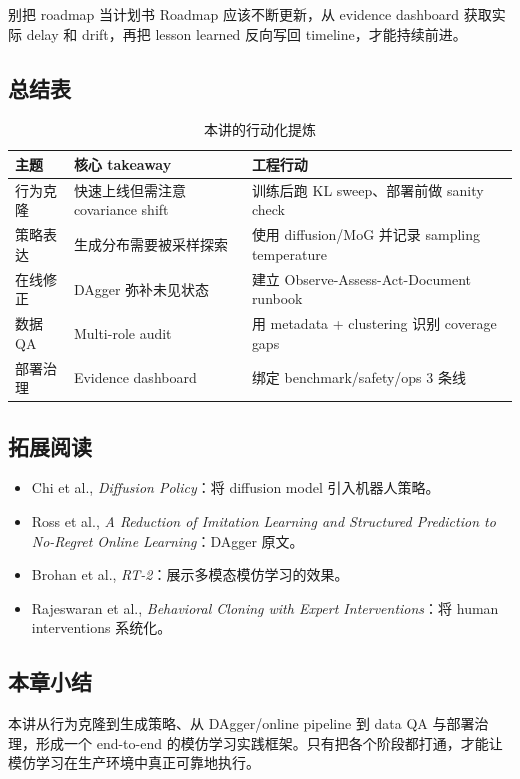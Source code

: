 \begin{warningbox}{别把 roadmap 当计划书}
Roadmap 应该不断更新，从 evidence dashboard 获取实际 delay 和 drift，再把 lesson learned 反向写回 timeline，才能持续前进。
\end{warningbox}

\subsection{总结表}

\begin{table}[H]
\centering
\begin{tabular}{p{} p{} p{}}
\toprule
主题 & 核心 takeaway & 工程行动 \\
\midrule
行为克隆 & 快速上线但需注意 covariance shift & 训练后跑 KL sweep、部署前做 sanity check \\
策略表达 & 生成分布需要被采样探索 & 使用 diffusion/MoG 并记录 sampling temperature \\
在线修正 & DAgger 弥补未见状态 & 建立 Observe-Assess-Act-Document runbook \\
数据 QA & Multi-role audit & 用 metadata + clustering 识别 coverage gaps \\
部署治理 & Evidence dashboard & 绑定 benchmark/safety/ops 3 条线 \\
\bottomrule
\end{tabular}
\caption{本讲的行动化提炼}
\end{table}

\subsection{拓展阅读}
\begin{itemize}
    \item Chi et al., \textit{Diffusion Policy}：将 diffusion model 引入机器人策略。
    \item Ross et al., \textit{A Reduction of Imitation Learning and Structured Prediction to No-Regret Online Learning}：DAgger 原文。
    \item Brohan et al., \textit{RT-2}：展示多模态模仿学习的效果。
    \item Rajeswaran et al., \textit{Behavioral Cloning with Expert Interventions}：将 human interventions 系统化。
\end{itemize}

\subsection{本章小结}

本讲从行为克隆到生成策略、从 DAgger/online pipeline 到 data QA 与部署治理，形成一个 end-to-end 的模仿学习实践框架。只有把各个阶段都打通，才能让模仿学习在生产环境中真正可靠地执行。


